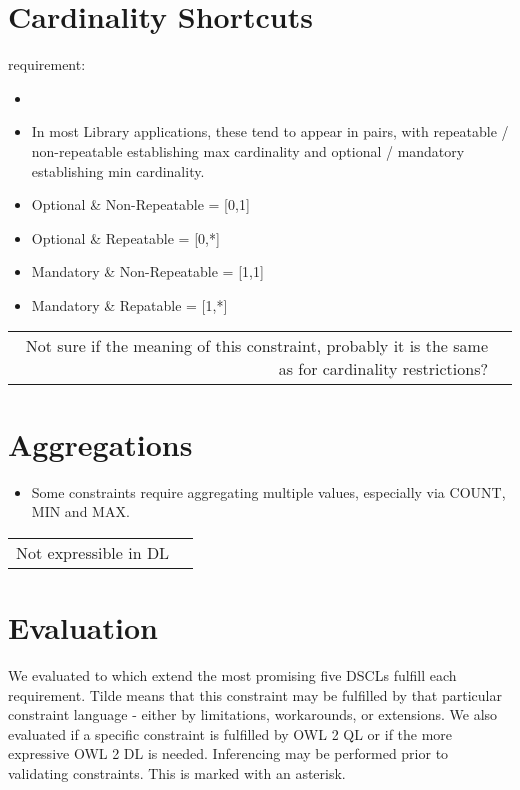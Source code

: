 \documentclass{llncs}
\newenvironment{DL}{
	\begin{center}
  \begin{tabular}{r l}

}{
  \end{tabular}
	\end{center}
}
\newcommand{\an}[1]{\todo[size=\small, color=green!40]{\textbf{Andy:} #1}}
\begin{document}
\section{Cardinality Shortcuts}

requirement:

\begin{itemize}
	\item 
\end{itemize}



\begin{itemize}
  \item In most Library applications, these tend to appear in pairs, with repeatable / non-repeatable establishing max cardinality and optional / mandatory establishing min cardinality.
	\item Optional \& Non-Repeatable = [0,1]
  \item Optional \& Repeatable = [0,*]
  \item Mandatory \& Non-Repeatable = [1,1]
  \item Mandatory \& Repatable = [1,*]
\end{itemize}

\begin{DL}
Not sure if the meaning of this constraint, probably it is the same as for cardinality restrictions?
\end{DL}

\an{not sure!}

\section{Aggregations}

\begin{itemize}
  \item Some constraints require aggregating multiple values, especially via COUNT, MIN and MAX. 
\end{itemize}

\begin{DL}
Not expressible in DL
\end{DL}

\section{Evaluation}

We evaluated to which extend the most promising five DSCLs fulfill each requirement.
Tilde means that this constraint may be fulfilled by that particular constraint language - either by limitations, workarounds, or extensions.
We also evaluated if a specific constraint is fulfilled by OWL 2 QL or if the more expressive OWL 2 DL is needed. 
Inferencing may be performed prior to validating constraints. This is marked with an asterisk.
\end{document}
